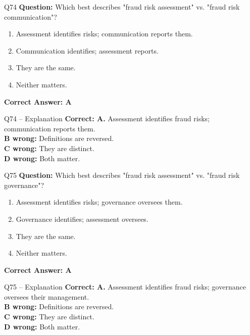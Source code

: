 \documentclass[aspectratio=169,10pt]{beamer}
\begin{document}
	\begin{frame}[t]{Q74}
		\small
		\textbf{Question:} Which best describes "fraud risk assessment" vs. "fraud risk communication"?
		\begin{enumerate}[label=\Alph*.,itemsep=1pt,topsep=2pt]
			\item Assessment identifies risks; communication reports them.
			\item Communication identifies; assessment reports.
			\item They are the same.
			\item Neither matters.
		\end{enumerate}
		\vspace{4pt}
		\textbf{Correct Answer: A}
	\end{frame}
	
	\begin{frame}[t]{Q74 -- Explanation}
		\small
		\textbf{Correct: A.} Assessment identifies fraud risks; communication reports them. \\[4pt]
		\textbf{B wrong:} Definitions are reversed. \\[2pt]
		\textbf{C wrong:} They are distinct. \\[2pt]
		\textbf{D wrong:} Both matter.
	\end{frame}
	
	\begin{frame}[t]{Q75}
		\small
		\textbf{Question:} Which best describes "fraud risk assessment" vs. "fraud risk governance"?
		\begin{enumerate}[label=\Alph*.,itemsep=1pt,topsep=2pt]
			\item Assessment identifies risks; governance oversees them.
			\item Governance identifies; assessment oversees.
			\item They are the same.
			\item Neither matters.
		\end{enumerate}
		\vspace{4pt}
		\textbf{Correct Answer: A}
	\end{frame}
	
	\begin{frame}[t]{Q75 -- Explanation}
		\small
		\textbf{Correct: A.} Assessment identifies fraud risks; governance oversees their management. \\[4pt]
		\textbf{B wrong:} Definitions are reversed. \\[2pt]
		\textbf{C wrong:} They are distinct. \\[2pt]
		\textbf{D wrong:} Both matter.
	\end{frame}
	
\end{document}
